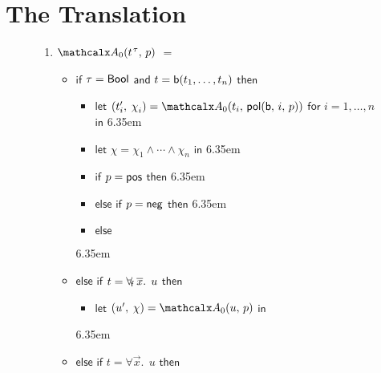 
\section{The Translation}
\label{sec:encoding}

\newcommand{\itemx}{\itemindent6.35em\item}

\begin{figure}[t]
\normalsize
\begin{enumerate}
\itemx[\ ]
$\conv_0( t\typ{\tau},\, p )$ $=$
 \begin{itemize}
   \itemx[] $\mathsf{if}$ $\tau = \mathsf{Bool}$ $\mathsf{and}$ $t = \mathsf{b}(t_1,\ldots,t_n)$ $\mathsf{then}$
    \begin{itemize}
      \itemx[] $\mathsf{let}$ $( t'_i,\, \chi_i ) = \conv_0( t_i,\, \pol( \boolop,\, i,\, p ) )$ $\mathsf{for}$ $i = 1, \ldots, n$ $\mathsf{in}$%
      \itemx[] $\mathsf{let}$ $\chi = \chi_1 \wedge \cdots \wedge \chi_n$ $\mathsf{in}$
      \itemx[] $\mathsf{if}$ $p = \mathsf{pos}$ $\mathsf{then}$ 
      \itemx[] $\mathsf{else}$ $\mathsf{if}$ $p = \mathsf{neg}$ $\mathsf{then}$ 
      \itemx[] $\mathsf{else}$ 
    \end{itemize}
  \itemx[] $\mathsf{else}$ $\mathsf{if}$ $t = \forall_{\!\mathsf{f}\:} \overline{x}.\;\, u$ $\mathsf{then}$
    \begin{itemize}
      \itemx[] $\mathsf{let}$ $( u',\, \chi ) = \conv_0( u,\, p )$ $\mathsf{in}$ 
    \end{itemize}
  \itemx[] $\mathsf{else}$ $\mathsf{if}$ $t = \forall \vec x.\;\, u$ $\mathsf{then}$
    \begin{itemize}

\end{itemize}
\end{itemize}
\end{enumerate}
\end{figure}
